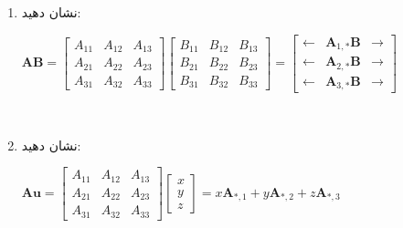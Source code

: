 {\begin{spacing}{1.5}
\begin{enumerate}[label=\textbf{\arabic*}.]
            \item {نشان دهید:
                \begin{center}
                    $\textbf{AB}=\begin{bmatrix}
                                     A_{11} & A_{12} & A_{13} \\
                                     A_{21} & A_{22} & A_{23} \\
                                     A_{31} & A_{32} & A_{33}
                    \end{bmatrix}\begin{bmatrix}
                                     B_{11} & B_{12} & B_{13} \\
                                     B_{21} & B_{22} & B_{23} \\
                                     B_{31} & B_{32} & B_{33}
                    \end{bmatrix}=\begin{bmatrix}
                                      \leftarrow & \textbf{A}_{1,*}\textbf{B} & \rightarrow \\
                                      \leftarrow & \textbf{A}_{2,*}\textbf{B} & \rightarrow \\
                                      \leftarrow & \textbf{A}_{3,*}\textbf{B} & \rightarrow
                    \end{bmatrix}$
                \end{center}
            }  \\\textbf{\vspace{6pt}}

            \item {نشان دهید:
                \begin{center}
                    $\textbf{Au}=\begin{bmatrix}
                                     A_{11} & A_{12} & A_{13} \\
                                     A_{21} & A_{22} & A_{23} \\
                                     A_{31} & A_{32} & A_{33}
                    \end{bmatrix}\begin{bmatrix}
                                     x \\
                                     y \\
                                     z
                    \end{bmatrix}=x\textbf{A}_{*,1}+y\textbf{A}_{*,2}+z\textbf{A}_{*,3}$
                \end{center}
            }  \\\textbf{\vspace{6pt}}


\end{enumerate}
\end{spacing}}
